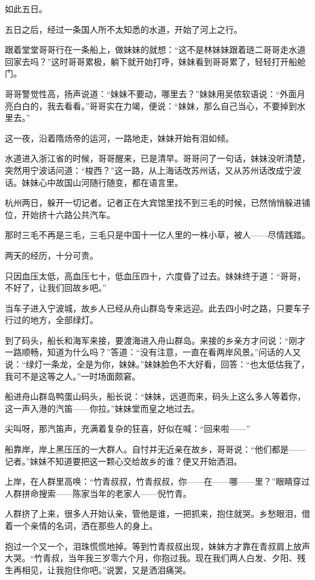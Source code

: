 \par 如此五日。
\par 五日之后，经过一条国人所不太知悉的水道，开始了河上之行。
\par 跟着堂堂哥哥行在一条船上，做妹妹的就想：“这不是林妹妹跟着琏二哥哥走水道回家去吗？”这时哥哥累极，躺下就开始打呼，妹妹看到哥哥累了，轻轻打开船舱门。
\par 哥哥警觉性高，扬声说道：“妹妹不要动，哪里去？”妹妹用吴侬软语说：“外面月亮白白的，我去看看。”哥哥实在力竭，便说：“妹妹，那么自己当心，不要掉到水里去。”
\par 这一夜，沿着隋炀帝的运河，一路地走，妹妹开始有泪如倾。
\par 水道进入浙江省的时候，哥哥醒来，已是清早。哥哥问了一句话，妹妹没听清楚，突然用宁波话问道：“梭西？”这一路，从上海话改苏州话，又从苏州话改成宁波话。妹妹心中故国山河随行随变，都在语言里。
\par 杭州两日，躲开一切记者。记者正在大宾馆里找不到三毛的时候，已然悄悄躲进铺位，开始挤十六路公共汽车。
\par 那时三毛不再是三毛，三毛只是中国十一亿人里的一株小草，被人——尽情践踏。
\par 两天的经历，十分可贵。
\par 只因血压太低，高血压七十，低血压四十，六度昏了过去。妹妹终于道：“哥哥，不好了，让我们回故乡吧。”
\par 当车子进入宁波城，故乡人已经从舟山群岛专来远迎。此去四小时之路，只要车子行过的地方，全部绿灯。
\par 到了码头，船长和海军来接，要渡海进入舟山群岛。来接的乡亲方才问说：“刚才一路顺畅，知道为什么吗？”答道：“没有注意，一直在看两岸风景。”问话的人又说：“绿灯一条龙，全是为你，妹妹。”妹妹脸色不大好看，回答：“也太低估我了，我可不是这等之人。”一时场面颇窘。
\par 船进舟山群岛鸭蛋山码头，船长说：“妹妹，远道而来，码头上这么多人等着你，这一声入港的汽笛——你拉。”妹妹堂而皇之地过去。
\par 尖叫呀，那汽笛声，充满着复杂的狂喜，好似在喊：“回来啦——”
\par 船靠岸，岸上黑压压的一大群人。自忖并无近亲在故乡，哥哥说：“他们都是——记者。”妹妹不知道要把这一颗心交给故乡的谁？便又开始洒泪。
\par 上岸，在人群里高唤：“竹青叔叔，竹青叔叔，你——在——哪——里？”眼睛穿过人群拼命搜索——陈家当年的老家人——倪竹青。
\par 人群挤了上来，很多人开始认亲，管他是谁，一把抓来，抱住就哭。乡愁眼泪，借着一个亲情的名词，洒在那些人的身上。
\par 抱过一个又一个，泪珠慌慌地掉。等到竹青叔叔出现，妹妹方才靠在青叔肩上放声大哭。“竹青叔，当年我三岁零六个月，你抱过我。现在我们两人白发、夕阳、残生再相见，让我抱住你吧。”说罢，又是洒泪痛哭。
